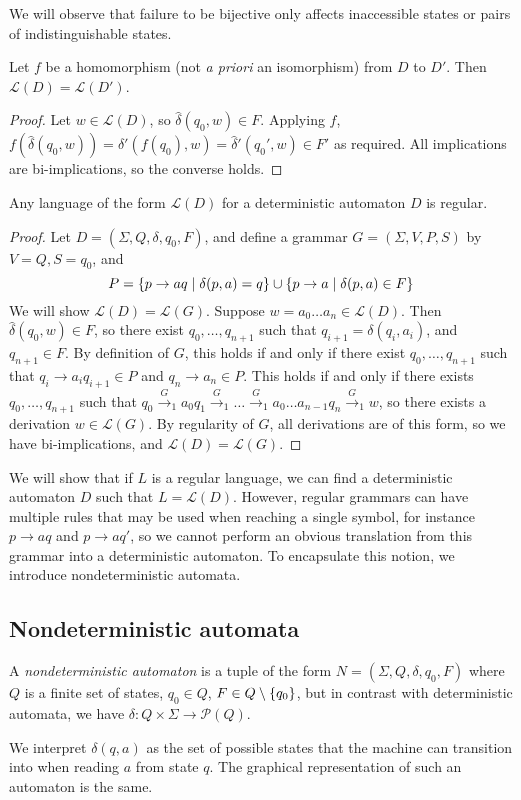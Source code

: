 We will observe that failure to be bijective only affects inaccessible states or pairs of indistinguishable states.
\begin{proposition}
	Let \( f \) be a homomorphism (not \emph{a priori} an isomorphism) from \( D \) to \( D' \).
	Then \( \mathcal L(D) = \mathcal L(D') \).
\end{proposition}
\begin{proof}
	Let \( w \in \mathcal L(D) \), so \( \hat\delta(q_0,w) \in F \).
	Applying \( f \), \( f(\hat\delta(q_0,w)) = \hat\delta'(f(q_0),w) = \hat\delta'(q_0',w) \in F' \) as required.
	All implications are bi-implications, so the converse holds.
\end{proof}
\begin{theorem}
	Any language of the form \( \mathcal L(D) \) for a deterministic automaton \( D \) is regular.
\end{theorem}
\begin{proof}
	Let \( D = (\Sigma, Q, \delta, q_0, F) \), and define a grammar \( G = (\Sigma, V, P, S) \) by \( V = Q, S = q_0 \), and
	\[ P = \qty{p \to aq \mid \delta(p, a) = q} \cup \qty{p \to a \mid \delta(p,a) \in F} \]
	We will show \( \mathcal L(D) = \mathcal L(G) \).
	Suppose \( w = a_0\dots a_n \in \mathcal L(D) \).
	Then \( \hat \delta(q_0,w) \in F \), so there exist \( q_0, \dots, q_{n+1} \) such that \( q_{i+1} = \delta(q_i, a_i) \), and \( q_{n+1} \in F \).
	By definition of \( G \), this holds if and only if there exist \( q_0, \dots, q_{n+1} \) such that \( q_i \to a_i q_{i+1} \in P \) and \( q_n \to a_n \in P \).
	This holds if and only if there exists \( q_0, \dots, q_{n+1} \) such that \( q_0 \xrightarrow G_1 a_0 q_1 \xrightarrow G_1 \dots \xrightarrow G_1 a_0 \dots a_{n-1} q_n \xrightarrow G_1 w \), so there exists a derivation \( w \in \mathcal L(G) \).
	By regularity of \( G \), all derivations are of this form, so we have bi-implications, and \( \mathcal L(D) = \mathcal L(G) \).
\end{proof}
We will show that if \( L \) is a regular language, we can find a deterministic automaton \( D \) such that \( L = \mathcal L(D) \).
However, regular grammars can have multiple rules that may be used when reaching a single symbol, for instance \( p \to aq \) and \( p \to aq' \), so we cannot perform an obvious translation from this grammar into a deterministic automaton.
To encapsulate this notion, we introduce nondeterministic automata.

\subsection{Nondeterministic automata}
\begin{definition}
	A \emph{nondeterministic automaton} is a tuple of the form \( N = (\Sigma, Q, \delta, q_0, F) \) where \( Q \) is a finite set of states, \( q_0 \in Q \), \( F \in Q \setminus \qty{q_0} \), but in contrast with deterministic automata, we have \( \delta \colon Q \times \Sigma \to \mathcal P(Q) \).
\end{definition}
We interpret \( \delta(q,a) \) as the set of possible states that the machine can transition into when reading \( a \) from state \( q \).
The graphical representation of such an automaton is the same.

